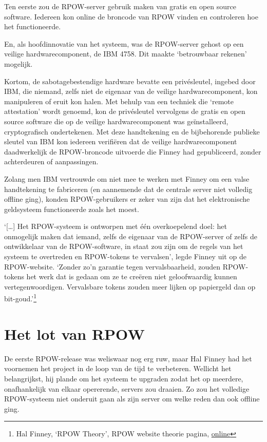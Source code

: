 \documentclass[smalldemyvopaper,11pt,twoside,onecolumn,openright,extrafontsizes,hidelinks]{memoir}
\begin{document}
Ten eerste zou de RPOW-server gebruik maken van gratis en open source
software. Iedereen kon online de broncode van RPOW vinden en controleren
hoe het functioneerde.

En, als hoofdinnovatie van het systeem, was de RPOW-server gehost op een
veilige hardwarecomponent, de IBM 4758. Dit maakte `betrouwbaar rekenen'
mogelijk.

Kortom, de sabotagebestendige hardware bevatte een privésleutel, ingebed
door IBM, die niemand, zelfs niet de eigenaar van de veilige
hardwarecomponent, kon manipuleren of eruit kon halen. Met behulp van
een techniek die `remote attestation' wordt genoemd, kon de privésleutel
vervolgens de gratis en open source software die op de veilige
hardwarecomponent was geïnstalleerd, cryptografisch ondertekenen. Met
deze handtekening en de bijbehorende publieke sleutel van IBM kon
iedereen verifiëren dat de veilige hardwarecomponent daadwerkelijk de
RPOW-broncode uitvoerde die Finney had gepubliceerd, zonder achterdeuren
of aanpassingen.

Zolang men IBM vertrouwde om niet mee te werken met Finney om een valse
handtekening te fabriceren (en aannemende dat de centrale server niet
volledig offline ging), konden RPOW-gebruikers er zeker van zijn dat het
elektronische geldsysteem functioneerde zoals het moest.

`{[}\ldots{]} Het RPOW-systeem is ontworpen met één overkoepelend doel:
het onmogelijk maken dat iemand, zelfs de eigenaar van de RPOW-server of
zelfs de ontwikkelaar van de RPOW-software, in staat zou zijn om de
regels van het systeem te overtreden en RPOW-tokens te vervalsen', legde
Finney uit op de RPOW-website. `Zonder zo'n garantie tegen
vervalsbaarheid, zouden RPOW-tokens het werk dat is gedaan om ze te
creëren niet geloofwaardig kunnen vertegenwoordigen. Vervalsbare tokens
zouden meer lijken op papiergeld dan op bit-goud.'\footnote{Hal Finney,
  `RPOW Theory', RPOW website theorie pagina,
  \href{https://web.archive.org/web/20040815154951/http://rpow.net/theory.html}{online}}

\section{Het lot van RPOW}\label{het-lot-van-rpow}

De eerste RPOW-release was weliswaar nog erg ruw, maar Hal Finney had
het voornemen het project in de loop van de tijd te verbeteren. Wellicht
het belangrijkst, hij plande om het systeem te upgraden zodat het op
meerdere, onafhankelijk van elkaar opererende, servers zou draaien. Zo
zou het volledige RPOW-systeem niet onderuit gaan als zijn server om
welke reden dan ook offline ging.
\end{document}
